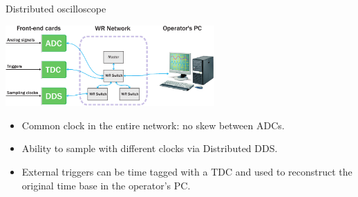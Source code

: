 \documentclass[compress,red]{beamer}
\begin{document}


\begin{frame}{Distributed oscilloscope}
  \begin{center}
    \includegraphics[width=8cm]{distr_oscill.pdf}
    \end{center}
    \begin{block}{}
      \begin{itemize}
      \item Common clock in the entire network: no skew between ADCs.
      \item Ability to sample with different clocks via Distributed DDS.
      \item External triggers can be time tagged with a TDC and used to reconstruct the original time base in the operator's PC.
      \end{itemize}
    \end{block}
\end{frame}



\end{document}
